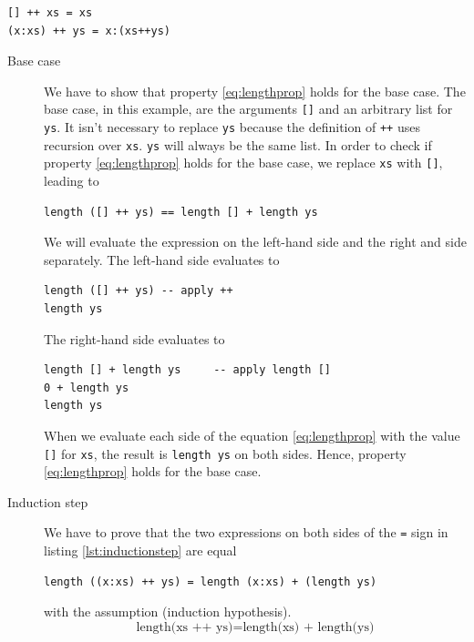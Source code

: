 \begin{lstlisting}[caption={Haskell function definition of the concatenation operator},label={lst:concatdefintion}]
[] ++ xs = xs
(x:xs) ++ ys = x:(xs++ys)
\end{lstlisting}

\begin{description}
\item[Base case]
We have to show that property \ref{eq:lengthprop} holds for the base case. The base case, in this example, are the arguments \verb|[]| and an arbitrary list for \verb|ys|. It isn't necessary to replace \verb|ys| because the definition of \verb|++| uses recursion over \verb|xs|. \verb|ys| will always be the same list.
In order to check if property \ref{eq:lengthprop} holds for the base case, we replace \verb|xs| with  \verb|[]|, leading to

\begin{verbatim}
length ([] ++ ys) == length [] + length ys
\end{verbatim}

We will evaluate the expression on the left-hand side and the right and side separately.
The left-hand side evaluates to

\begin{verbatim}
length ([] ++ ys) -- apply ++
length ys
\end{verbatim}

The right-hand side evaluates to 

\begin{verbatim}
length [] + length ys     -- apply length []
0 + length ys
length ys
\end{verbatim}

When we evaluate each side of the equation \ref{eq:lengthprop} with the value \verb|[]| for \verb|xs|, the result is \verb|length ys| on both sides. Hence, property \ref{eq:lengthprop} holds for the base case.

\item[Induction step]
 We have to prove that the two expressions on both sides of the \verb|=| sign in listing \ref{lst:inductionstep} are equal
\begin{lstlisting}[caption={The left-hand side and the right-hand side have to be equal},label={lst:inductionstep}]
length ((x:xs) ++ ys) = length (x:xs) + (length ys)
\end{lstlisting}

with the assumption (induction hypothesis).
\begin{equation}
  \label{eq:induction_hypothesis}
      \text{length(xs ++ ys)} = \text{length(xs) + length(ys)}
\end{equation}


\end{description}
